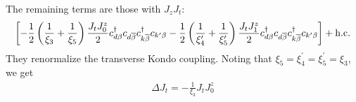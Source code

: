 \documentclass[12pt,twoside]{report}
\numberwithin{equation}{section}
\begin{document}
The remaining terms are those with \(J_z J_t\):
\begin{equation}\begin{aligned}
	\left[-\frac{1}{2}\left(\frac{1}{\xi_3} + \frac{1}{\xi_5}\right)\frac{J_t J^z_0}{2}c^\dagger_{d\beta}c_{d\overline\beta}c^\dagger_{k\overline\beta}c_{k^\prime\beta}-\frac{1}{2}\left(\frac{1}{\xi^\prime_4} + \frac{1}{\xi^\prime_5}\right)\frac{J_t J^z_1}{2}c^\dagger_{d\beta}c_{d\overline\beta}c^\dagger_{k\overline\beta}c_{k^\prime\beta}\right] + \text{h.c.}
\end{aligned}\end{equation}
They renormalize the transverse Kondo coupling. Noting that \(\xi_5 = \xi_4^\prime = \xi_5^\prime = \xi_3\), we get
\begin{equation}\begin{aligned}
	\label{Jt}
	\Delta J_t = -\frac{1}{\xi_3}J_t J^z_0
\end{aligned}\end{equation}
\end{document}
